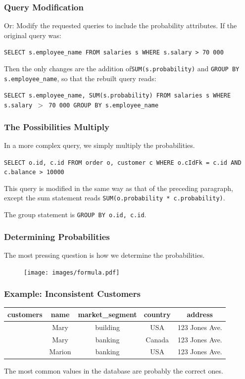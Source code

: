 \begin{frame}
\frametitle{Query Modification}

Or: Modify the requested queries to include the probability attributes. If the original query was:

\texttt{SELECT s.employee\_name FROM salaries s WHERE s.salary > 70~000}


Then the only changes are the addition of\texttt{SUM(s.probability)} and \texttt{GROUP BY s.employee\_name}, so that the rebuilt query reads:


\texttt{SELECT s.employee\_name, SUM(s.probability) FROM salaries s WHERE s.salary $>$ 70~000 GROUP BY s.employee\_name}


\end{frame}


\begin{frame}
\frametitle{The Possibilities Multiply}

In a more complex query, we simply multiply the probabilities. 

\texttt{SELECT o.id, c.id FROM order o, customer c  WHERE o.cIdFk = c.id AND c.balance > 10000 }


This query is modified in the same way as that of the preceding paragraph, except the sum statement reads \texttt{SUM(o.probability * c.probability)}.

The group statement is \texttt{GROUP BY o.id, c.id}.


\end{frame}


\begin{frame}
\frametitle{Determining Probabilities}

The most pressing question is how we determine the probabilities. 

\begin{figure}[!h]
  \centering \texttt{[image: images/formula.pdf]}
\end{figure}

\end{frame}


\begin{frame}
\frametitle{Example: Inconsistent Customers}

\begin{table}[h]\begin{center}
        \begin{tabular}{r | c  c  c  c } 
					customers & name & market\_segment & country & address\\ \hline
	           		 & Mary   & building & USA    & 123 Jones Ave. \\ 
	         		 & Mary   & banking  & Canada & 123 Jones Ave. \\ 
					 & Marion & banking  & USA    & 123 Jones Ave. \\ 
        \end{tabular}
        
\end{center}\end{table}

The most common values in the database are probably the correct ones.

\end{frame}



